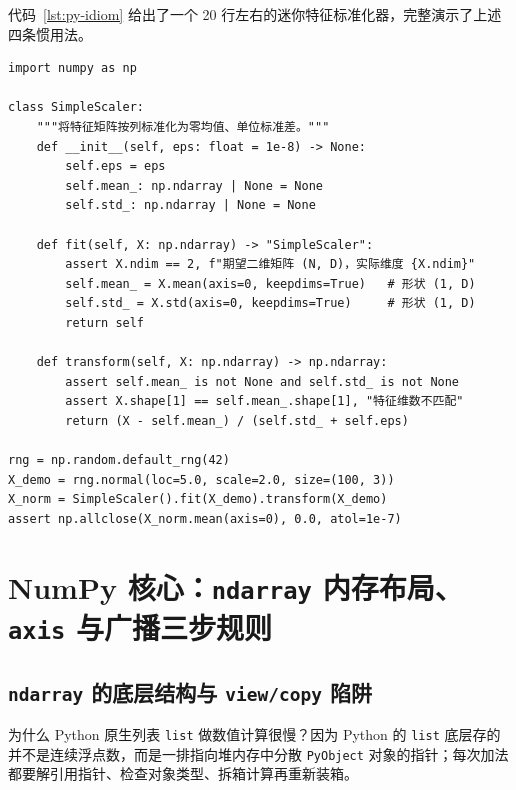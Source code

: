 代码~\ref{lst:py-idiom} 给出了一个 20 行左右的迷你特征标准化器，完整演示了上述四条惯用法。

\begin{lstlisting}[caption={融合类型标注、形状断言、类封装与独立随机生成器的 Python 惯用法}, label={lst:py-idiom}]
import numpy as np

class SimpleScaler:
    """将特征矩阵按列标准化为零均值、单位标准差。"""
    def __init__(self, eps: float = 1e-8) -> None:
        self.eps = eps
        self.mean_: np.ndarray | None = None
        self.std_: np.ndarray | None = None

    def fit(self, X: np.ndarray) -> "SimpleScaler":
        assert X.ndim == 2, f"期望二维矩阵 (N, D)，实际维度 {X.ndim}"
        self.mean_ = X.mean(axis=0, keepdims=True)   # 形状 (1, D)
        self.std_ = X.std(axis=0, keepdims=True)     # 形状 (1, D)
        return self

    def transform(self, X: np.ndarray) -> np.ndarray:
        assert self.mean_ is not None and self.std_ is not None
        assert X.shape[1] == self.mean_.shape[1], "特征维数不匹配"
        return (X - self.mean_) / (self.std_ + self.eps)

rng = np.random.default_rng(42)
X_demo = rng.normal(loc=5.0, scale=2.0, size=(100, 3))
X_norm = SimpleScaler().fit(X_demo).transform(X_demo)
assert np.allclose(X_norm.mean(axis=0), 0.0, atol=1e-7)
\end{lstlisting}

\section{NumPy 核心：\texttt{ndarray} 内存布局、\texttt{axis} 与广播三步规则}\label{sec:numpy-core}

\subsection{\texttt{ndarray} 的底层结构与 \texttt{view/copy} 陷阱}

为什么 Python 原生列表 \texttt{list} 做数值计算很慢？因为 Python 的 \texttt{list} 底层存的并不是连续浮点数，而是一排指向堆内存中分散 \texttt{PyObject} 对象的指针；每次加法都要解引用指针、检查对象类型、拆箱计算再重新装箱。

